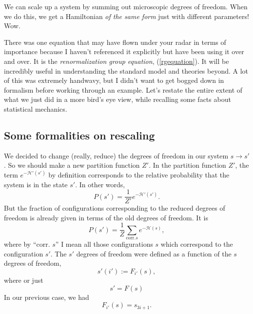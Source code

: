 \documentclass[main.tex]{subfiles}
\begin{document}
We can scale up a system by summing out microscopic degrees of freedom. When we do this, we get a Hamiltonian \textit{of the same form} just with different parameters! Wow.

There was one equation that may have flown under your radar in terms of importance because I haven't referenced it explicitly but have been using it over and over. It is the \textit{renormalization group equation}, (\ref{rgequation}). It will be incredibly useful in understanding the standard model and theories beyond. A lot of this was extremely handwavy, but I didn't want to get bogged down in formalism before working through an example. Let's restate the entire extent of what we just did in a more bird's eye view, while recalling some facts about statistical mechanics.

\subsection{Some formalities on rescaling}
We decided to change (really, reduce) the degrees of freedom in our system $s \to s'$. So we should make a new partition function $Z'$. In the partition function $Z'$, the term $e^{-\mathcal{H}'(s')}$ by definition corresponds to the relative probability that the system is in the state $s'$. In other words,
\[
P(s') = \frac{1}{Z'} e^{-\mathcal{H}'(s')}.
\]
But the fraction of configurations corresponding to the reduced degrees of freedom is already given in terms of the old degrees of freedom. It is
\begin{equation} \label{meh}
P(s') = \frac{1}{Z} \sum_{\text{corr.} s} e^{-\mathcal{H}(s)},
\end{equation}
where by ``corr. $s$'' I mean all those configurations $s$ which correspond to the configuration $s'$. The $s'$ degrees of freedom were defined as a function of the $s$ degrees of freedom,
\[
s'(i') := F_{i'} (s),
\]
where or just
\[
s' = F(s)
\]
In our previous case, we had
\[
F_{i'} (s) = s_{3i +1}.
\]
\end{document}
